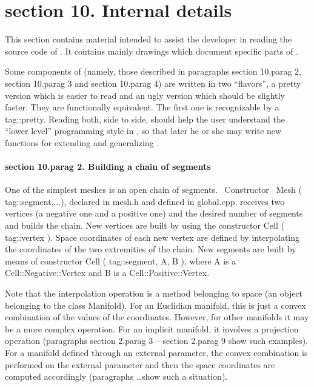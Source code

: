 \section{\numb section 10. Internal details}

This section contains material intended to assist the developer in reading the source code
of \maniFEM.
It contains mainly drawings which document specific parts of \maniFEM.

Some components of {\maniFEM} (namely, those described in paragraphs \numb section 10.\numb parag 2,
\numb section 10.\numb parag 3 and \numb section 10.\numb parag 4) are written in two ``flavors'',
a pretty version which is easier
to read and an ugly version which should be slightly faster.
They are functionally equivalent.
The first one is recognizable by a {\codett tag::pretty}.
Reading both, side to side, should help the user understand the ``lower level'' programming style
in {\maniFEM}, so that later he or she may write new functions for extending and generalizing
{\maniFEM}.


\paragraph{\numb section 10.\numb parag 2. Building a chain of segments}

One of the simplest meshes is an open chain of segments.
\ Constructor \ {\codett Mesh ( tag::segment,...)}, declared in {\codett mesh.h} and defined in
{\codett global.cpp}, receives two vertices (a negative one and a positive one)
and the desired number of segments and builds the chain.
New vertices are built by using the constructor {\codett Cell ( tag::vertex )}.
Space coordinates of each new vertex are defined by interpolating the coordinates of the
two extremities of the chain.
New segments are built by means of constructor {\codett Cell ( tag::segment, A, B )},
where {\codett A} is a {\codett Cell::Negative::Vertex} and {\codett B} is a
{\codett Cell::Positive::Vertex}.

Note that the interpolation operation is a method belonging to {\codett space}
(an object belonging to the class {\codett Manifold}).
For an Euclidian manifold, this is just a convex combination of the values of the coordinates.
However, for other manifolds it may be a more complex operation.
For an implicit manifold, it involves a projection operation
(paragraphs \numb section 2.\numb parag 3 -- \numb section 2.\numb parag 9 show such examples).
For a manifold defined through an external parameter, the convex combination is performed on
the external parameter and then the space coordinates are computed accordingly (paragraphs
\dots show such a situation).


